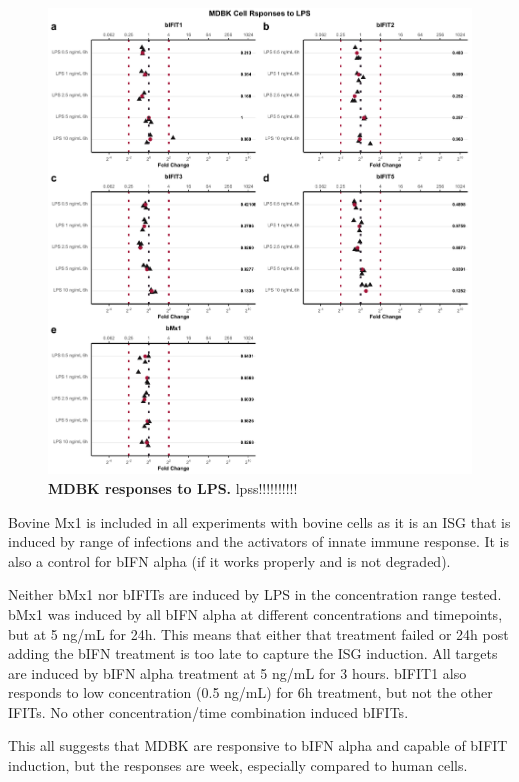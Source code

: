 \begin{figure}
    \centering
    \includegraphics[width=1\linewidth]{07. Chapter 2/Figs/02. Induction/02. mdbk_treat_lps.pdf}
    \caption[MDBK responses to LPS.]{\textbf{MDBK responses to LPS.} lpss!!!!!!!!!!}
    \label{MDBK responses to LPS}
\end{figure}

Bovine Mx1 is included in all experiments with bovine cells as it is an ISG that is induced by range of infections and the activators of innate immune response. It is also a control for bIFN alpha (if it works properly and is not degraded).

Neither bMx1 nor bIFITs are induced by LPS in the concentration range tested. bMx1 was induced by all bIFN alpha at different concentrations and timepoints, but at 5 ng/mL for 24h. This means that either that treatment failed or 24h post adding the bIFN treatment is too late to capture the ISG induction. All targets are induced by bIFN alpha treatment at 5 ng/mL for 3 hours. bIFIT1 also responds to low concentration (0.5 ng/mL) for 6h treatment, but not the other IFITs. No other concentration/time combination induced bIFITs. 

This all suggests that MDBK are responsive to bIFN alpha and capable of bIFIT induction, but the responses are week, especially compared to human cells.

